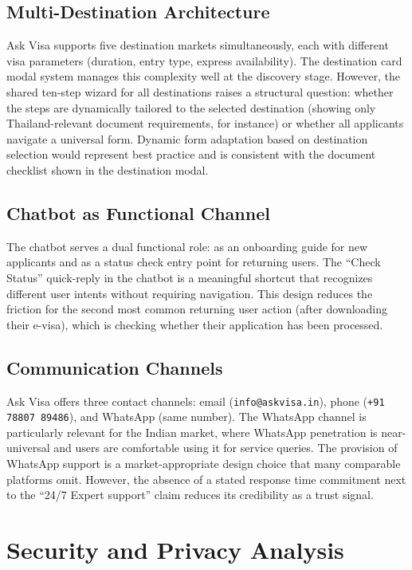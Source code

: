 \documentclass[journal, 10pt, twoside]{IEEEtran}
\begin{document}
\subsection{Multi-Destination Architecture}
Ask Visa supports five destination markets simultaneously, each with
different visa parameters (duration, entry type, express availability).
The destination card modal system manages this complexity well at the
discovery stage. However, the shared ten-step wizard for all destinations
raises a structural question: whether the steps are dynamically tailored
to the selected destination (showing only Thailand-relevant document
requirements, for instance) or whether all applicants navigate a
universal form. Dynamic form adaptation based on destination selection
would represent best practice and is consistent with the document
checklist shown in the destination modal.

\subsection{Chatbot as Functional Channel}
The chatbot serves a dual functional role: as an onboarding guide for
new applicants and as a status check entry point for returning users.
The ``Check Status'' quick-reply in the chatbot is a meaningful shortcut
that recognizes different user intents without requiring navigation.
This design reduces the friction for the second most common returning
user action (after downloading their e-visa), which is checking whether
their application has been processed.

\subsection{Communication Channels}
Ask Visa offers three contact channels: email (\texttt{info@askvisa.in}),
phone (\texttt{+91 78807 89486}), and WhatsApp (same number). The
WhatsApp channel is particularly relevant for the Indian market, where
WhatsApp penetration is near-universal and users are comfortable using
it for service queries. The provision of WhatsApp support is a
market-appropriate design choice that many comparable platforms omit.
However, the absence of a stated response time commitment next to the
``24/7 Expert support'' claim reduces its credibility as a trust signal.

\section{Security and Privacy Analysis}
\label{sec:security}
\end{document}
